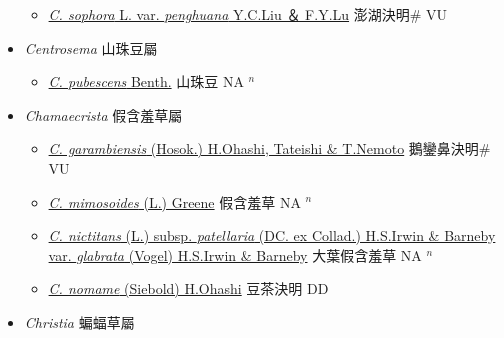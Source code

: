 \begin{itemize}
  \begin{itemize}
        \item[] \href{http://www.theplantlist.org/tpl1.1/search?q=Cassia+sophora+var.+penghuana}{\textit{C. sophora} L. var. \textit{penghuana} Y.C.Liu ＆ F.Y.Lu}   澎湖決明\# VU
  \end{itemize}
 \item[] \textit{Centrosema} 山珠豆屬
                    
  \begin{itemize}
        \item[] \href{http://www.theplantlist.org/tpl1.1/search?q=Centrosema+pubescens}{\textit{C. pubescens} Benth.}   山珠豆 NA $^n$
  \end{itemize}
 \item[] \textit{Chamaecrista} 假含羞草屬
                    
  \begin{itemize}
        \item[] \href{http://www.theplantlist.org/tpl1.1/search?q=Chamaecrista+garambiensis}{\textit{C. garambiensis} (Hosok.) H.Ohashi, Tateishi \& T.Nemoto}   鵝鑾鼻決明\# VU
        \item[] \href{http://www.theplantlist.org/tpl1.1/search?q=Chamaecrista+mimosoides}{\textit{C. mimosoides} (L.) Greene}   假含羞草 NA $^n$
        \item[] \href{http://www.theplantlist.org/tpl1.1/search?q=Chamaecrista+nictitans+subsp.+patellaria+var.+glabrata}{\textit{C. nictitans} (L.) subsp. \textit{patellaria} (DC. ex Collad.) H.S.Irwin \& Barneby var. \textit{glabrata} (Vogel) H.S.Irwin \& Barneby}   大葉假含羞草 NA $^n$
        \item[] \href{http://www.theplantlist.org/tpl1.1/search?q=Chamaecrista+nomame}{\textit{C. nomame} (Siebold) H.Ohashi}   豆茶決明 DD
  \end{itemize}
 \item[] \textit{Christia} 蝙蝠草屬
                    

\end{itemize}
